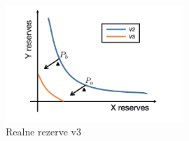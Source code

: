 \documentclass[a4paper,12pt]{article}%
\begin{document}
 




\begin{figure}[!ht]
    \centering
    \includegraphics[width=0.6\textwidth]{krivulja.png}
        \caption{Realne rezerve v3}
\end{figure}






\end{document}
